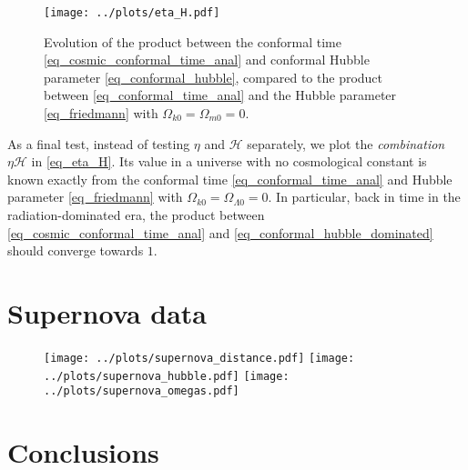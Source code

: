 \documentclass{aa}
\begin{document}
\begin{figure}
	\centering
	\texttt{[image: ../plots/eta\_H.pdf]}
	\caption{Evolution of the product between the conformal time \eqref{eq_cosmic_conformal_time_anal} and conformal Hubble parameter \eqref{eq_conformal_hubble}, compared to the product between \eqref{eq_conformal_time_anal} and the Hubble parameter \eqref{eq_friedmann} with $\Omega_{k0}=\Omega_{m0}=0$.}
	\label{fig_eta_H}
\end{figure}

As a final test,
instead of testing $\eta$ and $\mathcal{H}$ separately,
we plot the \emph{combination} $\eta \mathcal{H}$ in \cref{eq_eta_H}.
Its value in a universe with no cosmological constant is known exactly from the conformal time \eqref{eq_conformal_time_anal} and Hubble parameter \eqref{eq_friedmann} with $\Omega_{k0}=\Omega_{\Lambda0}=0$.
In particular, back in time in the radiation-dominated era, the product between \eqref{eq_cosmic_conformal_time_anal} and \eqref{eq_conformal_hubble_dominated} should converge towards $1$.


\section{Supernova data}

\begin{figure}
	\centering
	\texttt{[image: ../plots/supernova\_distance.pdf]}
	\texttt{[image: ../plots/supernova\_hubble.pdf]}
	\texttt{[image: ../plots/supernova\_omegas.pdf]}
\end{figure}

%

\section{Conclusions}


%
%
\end{document}
